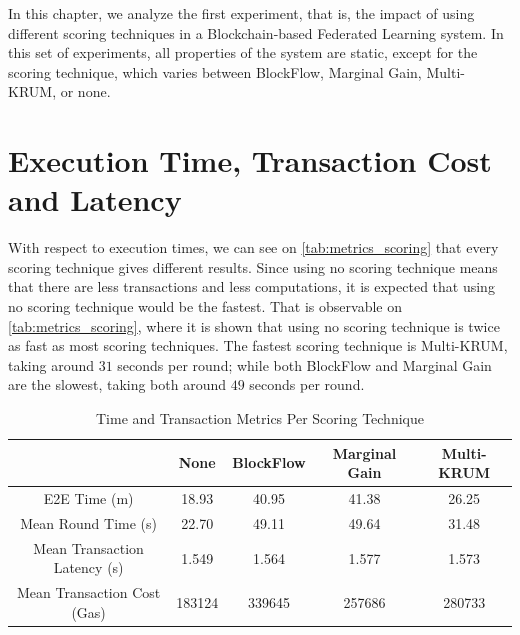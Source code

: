 In this chapter, we analyze the first experiment, that is, the impact of using different scoring techniques in a Blockchain-based Federated Learning system. In this set of experiments, all properties of the system are static, except for the scoring technique, which varies between BlockFlow, Marginal Gain, Multi-KRUM, or none.

\section{Execution Time, Transaction Cost and Latency}

With respect to execution times, we can see on \autoref{tab:metrics_scoring} that every scoring technique gives different results. Since using no scoring technique means that there are less transactions and less computations, it is expected that using no scoring technique would be the fastest. That is observable on \autoref{tab:metrics_scoring}, where it is shown that using no scoring technique is twice as fast as most scoring techniques. The fastest scoring technique is Multi-KRUM, taking around $31$ seconds per round; while both BlockFlow and Marginal Gain are the slowest, taking both around $49$ seconds per round.

\begin{table}[!ht]
\centering
\begin{tabular}{c|c|c|c|c} \hline \hline
                               & None   & BlockFlow & Marginal Gain & Multi-KRUM \\ \hline \hline
E2E Time (m)                   & 18.93  & 40.95     & 41.38         & 26.25      \\ \hline
Mean Round Time (s)            & 22.70  & 49.11     & 49.64         & 31.48      \\ \hline
Mean Transaction Latency (s)   & 1.549  & 1.564     & 1.577         & 1.573      \\ \hline
Mean Transaction Cost (Gas)    & 183124 & 339645    & 257686        & 280733     \\ \hline
\end{tabular}
\caption{Time and Transaction Metrics Per Scoring Technique}
\label{tab:metrics_scoring}
\end{table}

